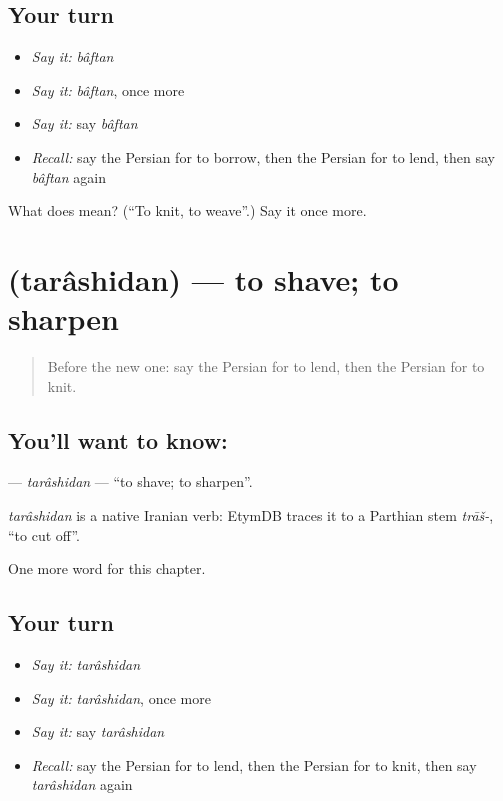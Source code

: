 \subsection*{Your turn}
\begin{itemize}
\raggedright
  \item \emph{Say it:} \emph{bâftan}
  \item \emph{Say it:} \emph{bâftan}, once more
  \item \emph{Say it:} say \emph{bâftan}
  \item \emph{Recall:} say the Persian for to borrow, then the Persian for to lend, then say \emph{bâftan} again
\end{itemize}

\begin{tcolorbox}[breakable,colback=teal!4,colframe=teal!35!black,title={Before you move on}]
What does  mean? (\textquotedblleft{}To knit, to weave\textquotedblright{}.) Say it once more.
\end{tcolorbox}
\section[\texorpdfstring{\fa{تراشیدن} (tarâshidan)}{تراشیدن (tarâshidan)}]{ (tarâshidan) — to shave; to sharpen}

\label{lesson:FA-C186-tarashidan}



\begin{quote}
Before the new one: say the Persian for to lend, then the Persian for to knit.
\end{quote}

\subsection*{You'll want to know: }
\textbf{} — \emph{tarâshidan} — \textquotedblleft{}to shave; to sharpen\textquotedblright{}.

\begin{cousinweb}
\emph{tarâshidan} is a native Iranian verb: EtymDB traces it to a Parthian stem \emph{trāš-}, \textquotedblleft{}to cut off\textquotedblright{}.
\end{cousinweb}

\begin{grammarlens}[title={What you've built}]
One more word for this chapter.
\end{grammarlens}

\subsection*{Your turn}
\begin{itemize}
\raggedright
  \item \emph{Say it:} \emph{tarâshidan}
  \item \emph{Say it:} \emph{tarâshidan}, once more
  \item \emph{Say it:} say \emph{tarâshidan}
  \item \emph{Recall:} say the Persian for to lend, then the Persian for to knit, then say \emph{tarâshidan} again
\end{itemize}

